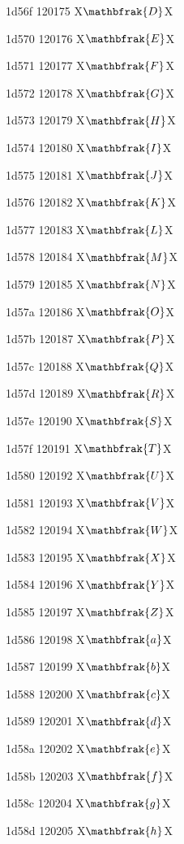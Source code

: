 \documentclass[11pt]{article}
\begin{document}
1d56f 120175 X{\ensuremath{\mathbfrak{D}}}X

1d570 120176 X{\ensuremath{\mathbfrak{E}}}X

1d571 120177 X{\ensuremath{\mathbfrak{F}}}X

1d572 120178 X{\ensuremath{\mathbfrak{G}}}X

1d573 120179 X{\ensuremath{\mathbfrak{H}}}X

1d574 120180 X{\ensuremath{\mathbfrak{I}}}X

1d575 120181 X{\ensuremath{\mathbfrak{J}}}X

1d576 120182 X{\ensuremath{\mathbfrak{K}}}X

1d577 120183 X{\ensuremath{\mathbfrak{L}}}X

1d578 120184 X{\ensuremath{\mathbfrak{M}}}X

1d579 120185 X{\ensuremath{\mathbfrak{N}}}X

1d57a 120186 X{\ensuremath{\mathbfrak{O}}}X

1d57b 120187 X{\ensuremath{\mathbfrak{P}}}X

1d57c 120188 X{\ensuremath{\mathbfrak{Q}}}X

1d57d 120189 X{\ensuremath{\mathbfrak{R}}}X

1d57e 120190 X{\ensuremath{\mathbfrak{S}}}X

1d57f 120191 X{\ensuremath{\mathbfrak{T}}}X

1d580 120192 X{\ensuremath{\mathbfrak{U}}}X

1d581 120193 X{\ensuremath{\mathbfrak{V}}}X

1d582 120194 X{\ensuremath{\mathbfrak{W}}}X

1d583 120195 X{\ensuremath{\mathbfrak{X}}}X

1d584 120196 X{\ensuremath{\mathbfrak{Y}}}X

1d585 120197 X{\ensuremath{\mathbfrak{Z}}}X

1d586 120198 X{\ensuremath{\mathbfrak{a}}}X

1d587 120199 X{\ensuremath{\mathbfrak{b}}}X

1d588 120200 X{\ensuremath{\mathbfrak{c}}}X

1d589 120201 X{\ensuremath{\mathbfrak{d}}}X

1d58a 120202 X{\ensuremath{\mathbfrak{e}}}X

1d58b 120203 X{\ensuremath{\mathbfrak{f}}}X

1d58c 120204 X{\ensuremath{\mathbfrak{g}}}X

1d58d 120205 X{\ensuremath{\mathbfrak{h}}}X
\end{document}

